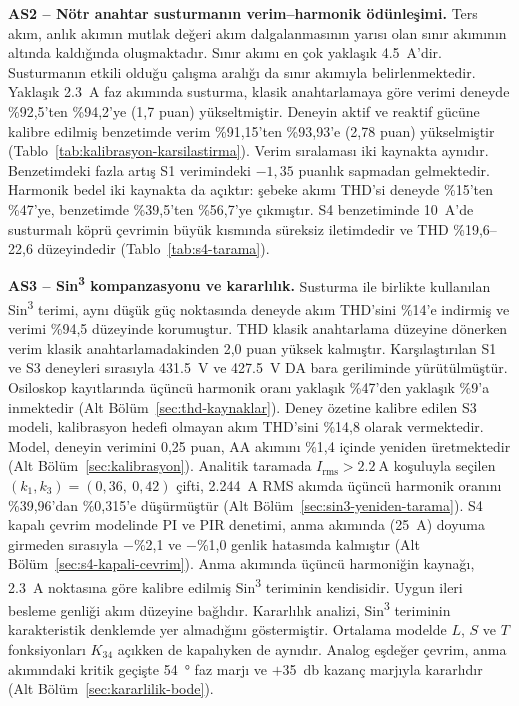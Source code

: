 \textbf{AS2 -- Nötr anahtar susturmanın verim--harmonik ödünleşimi.} Ters akım, anlık akımın mutlak değeri akım dalgalanmasının yarısı olan sınır akımının altında kaldığında oluşmaktadır. Sınır akımı en çok yaklaşık \SI{4.5}{\ampere}'dir. Susturmanın etkili olduğu çalışma aralığı da sınır akımıyla belirlenmektedir. Yaklaşık \SI{2.3}{\ampere} faz akımında susturma, klasik anahtarlamaya göre verimi deneyde \%92,5'ten \%94,2'ye (1,7 puan) yükseltmiştir. Deneyin aktif ve reaktif gücüne kalibre edilmiş benzetimde verim \%91,15'ten \%93,93'e (2,78 puan) yükselmiştir (Tablo~\ref{tab:kalibrasyon-karsilastirma}). Verim sıralaması iki kaynakta aynıdır. Benzetimdeki fazla artış S1 verimindeki $-1{,}35$ puanlık sapmadan gelmektedir. Harmonik bedel iki kaynakta da açıktır: şebeke akımı THD'si deneyde \%15'ten \%47'ye, benzetimde \%39,5'ten \%56,7'ye çıkmıştır. S4 benzetiminde \SI{10}{\ampere}'de susturmalı köprü çevrimin büyük kısmında süreksiz iletimdedir ve THD \%19,6--22,6 düzeyindedir (Tablo~\ref{tab:s4-tarama}).

\textbf{AS3 -- Sin\textsuperscript{3} kompanzasyonu ve kararlılık.} Susturma ile birlikte kullanılan Sin\textsuperscript{3} terimi, aynı düşük güç noktasında deneyde akım THD'sini \%14'e indirmiş ve verimi \%94,5 düzeyinde korumuştur. THD klasik anahtarlama düzeyine dönerken verim klasik anahtarlamadakinden 2,0 puan yüksek kalmıştır. Karşılaştırılan S1 ve S3 deneyleri sırasıyla \SI{431.5}{\volt} ve \SI{427.5}{\volt} DA bara geriliminde yürütülmüştür. Osiloskop kayıtlarında üçüncü harmonik oranı yaklaşık \%47'den yaklaşık \%9'a inmektedir (Alt Bölüm~\ref{sec:thd-kaynaklar}). Deney özetine kalibre edilen S3 modeli, kalibrasyon hedefi olmayan akım THD'sini \%14,8 olarak vermektedir. Model, deneyin verimini 0,25 puan, AA akımını \%1,4 içinde yeniden üretmektedir (Alt Bölüm~\ref{sec:kalibrasyon}). Analitik taramada $I_{\mathrm{rms}}>\SI{2.2}{\ampere}$ koşuluyla seçilen $(k_1,k_3)=(0{,}36,\ 0{,}42)$ çifti, \SI{2.244}{\ampere} RMS akımda üçüncü harmonik oranını \%39,96'dan \%0,315'e düşürmüştür (Alt Bölüm~\ref{sec:sin3-yeniden-tarama}). S4 kapalı çevrim modelinde PI ve PIR denetimi, anma akımında (\SI{25}{\ampere}) doyuma girmeden sırasıyla $-$\%2,1 ve $-$\%1,0 genlik hatasında kalmıştır (Alt Bölüm~\ref{sec:s4-kapali-cevrim}). Anma akımında üçüncü harmoniğin kaynağı, \SI{2.3}{\ampere} noktasına göre kalibre edilmiş Sin\textsuperscript{3} teriminin kendisidir. Uygun ileri besleme genliği akım düzeyine bağlıdır. Kararlılık analizi, Sin\textsuperscript{3} teriminin karakteristik denklemde yer almadığını göstermiştir. Ortalama modelde $L$, $S$ ve $T$ fonksiyonları $K_{34}$ açıkken de kapalıyken de aynıdır. Analog eşdeğer çevrim, anma akımındaki kritik geçişte \SI{54}{\degree} faz marjı ve $+$\SI{35}{\decibel} kazanç marjıyla kararlıdır (Alt Bölüm~\ref{sec:kararlilik-bode}).

